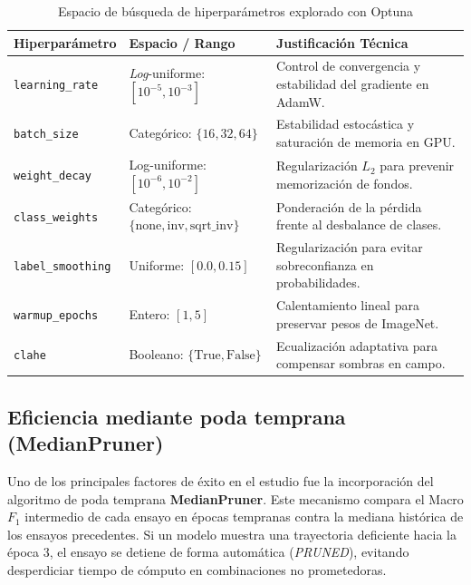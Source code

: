 \documentclass[12pt,letterpaper]{article}
\begin{document}
\begin{table}[H]
\caption{Espacio de b\'usqueda de hiperpar\'ametros explorado con Optuna}
\label{tab:hpo_space}
\centering
\small
\begin{singlespace}
\begin{tabular}{llp{7.5cm}}
\toprule
\textbf{Hiperpar\'ametro} & \textbf{Espacio / Rango} & \textbf{Justificaci\'on T\'ecnica} \\
\midrule
\texttt{learning\_rate} & \textit{Log}-uniforme: $[10^{-5}, 10^{-3}]$ & Control de convergencia y estabilidad del gradiente en AdamW. \\
\texttt{batch\_size} & Categ\'orico: $\{16, 32, 64\}$ & Estabilidad estoc\'astica y saturaci\'on de memoria en GPU. \\
\texttt{weight\_decay} & Log-uniforme: $[10^{-6}, 10^{-2}]$ & Regularizaci\'on $L_2$ para prevenir memorizaci\'on de fondos. \\
\texttt{class\_weights} & Categ\'orico: $\{\text{none}, \text{inv}, \text{sqrt\_inv}\}$ & Ponderaci\'on de la p\'erdida frente al desbalance de clases. \\
\texttt{label\_smoothing} & Uniforme: $[0.0, 0.15]$ & Regularizaci\'on para evitar sobreconfianza en probabilidades. \\
\texttt{warmup\_epochs} & Entero: $[1, 5]$ & Calentamiento lineal para preservar pesos de ImageNet. \\
\texttt{clahe} & Booleano: $\{\text{True}, \text{False}\}$ & Ecualizaci\'on adaptativa para compensar sombras en campo. \\
\bottomrule
\end{tabular}
\end{singlespace}
\end{table}

\subsection{Eficiencia mediante poda temprana (MedianPruner)}

Uno de los principales factores de \'exito en el estudio fue la incorporaci\'on del algoritmo de poda temprana \textbf{MedianPruner}. Este mecanismo compara el Macro $F_1$ intermedio de cada ensayo en \'epocas tempranas contra la mediana hist\'orica de los ensayos precedentes. Si un modelo muestra una trayectoria deficiente hacia la \'epoca 3, el ensayo se detiene de forma autom\'atica (\textit{PRUNED}), evitando desperdiciar tiempo de c\'omputo en combinaciones no prometedoras.
\end{document}
